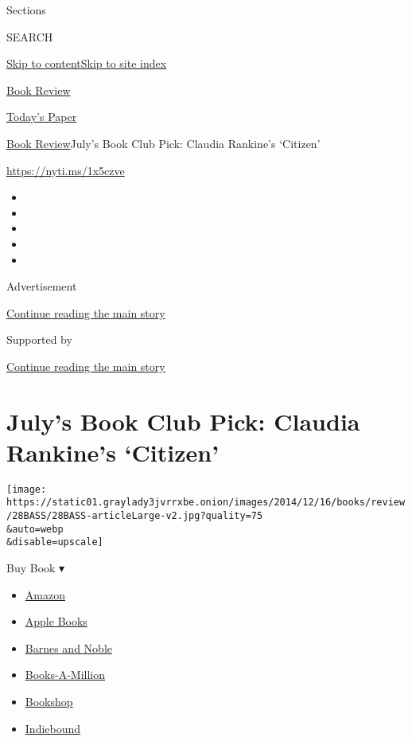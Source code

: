 Sections

SEARCH

\protect\hyperlink{site-content}{Skip to
content}\protect\hyperlink{site-index}{Skip to site index}

\href{https://www.nytimes3xbfgragh.onion/section/books/review}{Book
Review}

\href{https://myaccount.nytimes3xbfgragh.onion/auth/login?response_type=cookie\&client_id=vi}{}

\href{https://www.nytimes3xbfgragh.onion/section/todayspaper}{Today's
Paper}

\href{/section/books/review}{Book Review}\textbar{}July's Book Club
Pick: Claudia Rankine's `Citizen'

\url{https://nyti.ms/1x5czve}

\begin{itemize}
\item
\item
\item
\item
\item
\end{itemize}

Advertisement

\protect\hyperlink{after-top}{Continue reading the main story}

Supported by

\protect\hyperlink{after-sponsor}{Continue reading the main story}

\hypertarget{julys-book-club-pick-claudia-rankines-citizen}{%
\section{July's Book Club Pick: Claudia Rankine's
`Citizen'}\label{julys-book-club-pick-claudia-rankines-citizen}}

\texttt{[image: https://static01.graylady3jvrrxbe.onion/images/2014/12/16/books/review/28BASS/28BASS-articleLarge-v2.jpg?quality=75\\\&auto=webp\\\&disable=upscale]}

Buy Book ▾

\begin{itemize}
\tightlist
\item
  \href{https://www.amazon.com/gp/search?index=books\&tag=NYTBSREV-20\&field-keywords=Citizen\%3A+An+American+Lyric+Claudia+Rankine}{Amazon}
\item
  \href{https://du-gae-books-dot-nyt-du-prd.appspot.com/buy?title=Citizen\%3A+An+American+Lyric\&author=Claudia+Rankine}{Apple
  Books}
\item
  \href{https://www.anrdoezrs.net/click-7990613-11819508?url=https\%3A\%2F\%2Fwww.barnesandnoble.com\%2Fw\%2F\%3Fean\%3D9781555976903}{Barnes
  and Noble}
\item
  \href{https://www.anrdoezrs.net/click-7990613-35140?url=https\%3A\%2F\%2Fwww.booksamillion.com\%2Fp\%2FCitizen\%253A\%2BAn\%2BAmerican\%2BLyric\%2FClaudia\%2BRankine\%2F9781555976903}{Books-A-Million}
\item
  \href{https://bookshop.org/a/3546/9781555976903}{Bookshop}
\item
  \href{https://www.indiebound.org/book/9781555976903?aff=NYT}{Indiebound}
\end{itemize}

